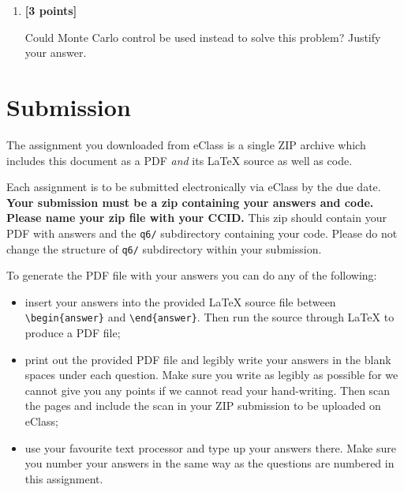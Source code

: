 \documentclass{article}
\newcounter{totalpoints}
\newcommand{\points}[1]{{\addtocounter{totalpoints}{#1}\textbf{[#1 points]}}}
\begin{document}
\begin{enumerate}
\begin{enumerate}
    \item \points{3}
    Could Monte Carlo control be used instead to solve this problem? Justify your answer.
    \begin{answer}{1.5in}
    \end{answer}
        
    
\end{enumerate}





\end{enumerate}

\section*{Submission}
The assignment you downloaded from eClass is a single ZIP archive which includes this document as a PDF {\em and} its \LaTeX{} source as well as code.

\medskip

Each assignment is to be submitted electronically via eClass by the due date.
\textbf{Your submission must be a zip containing your answers and code. Please name your zip file with your CCID. } This zip should contain your PDF with answers and the \texttt{q6/} subdirectory containing your code.
Please do not change the structure of \texttt{q6/} subdirectory within your submission. 

To generate the PDF file with your answers you can do any of the following:

\begin{itemize}
    \item
    insert your answers into the provided \LaTeX{} source file between \verb|\begin{answer}| and \verb|\end{answer}|. Then run the source through \LaTeX{} to produce a PDF file;

    \item print out the provided PDF file and legibly write your answers in the blank spaces under each question. Make sure you write as legibly as possible for we cannot give you any points if we cannot read your hand-writing. Then scan the pages and include the scan in your ZIP submission to be uploaded on eClass;

    \item use your favourite text processor and type up your answers there. Make sure you number your answers in the same way as the questions are numbered in this assignment.
\end{itemize}




%
%
\end{document}
